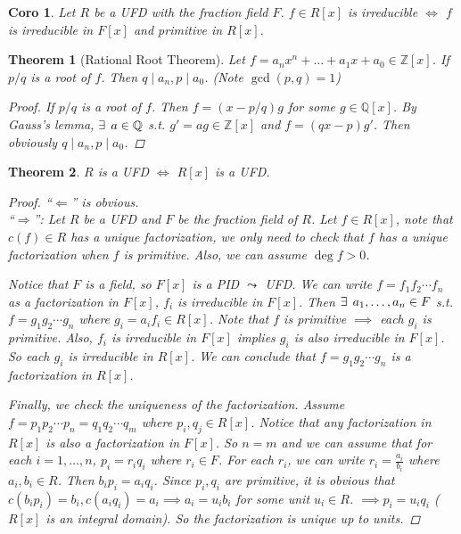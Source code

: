 \documentclass[a4paper]{article}
\let\existstemp\exists
\renewcommand*{\exists}{\existstemp\mkern4mu}
\newcommand{\Zb}{\mathbb{Z}}
\newcommand{\Qb}{\mathbb{Q}}
\theoremstyle{mystyle}
\newtheorem{theorem}{Theorem}
\newtheorem{coro}{Coro}
\begin{document}
\begin{coro}
  Let $R$ be a UFD with the fraction field $F$. $f \in R[x]$
  is irreducible $\iff$ $f$ is irreducible in $F[x]$ and primitive in $R[x]$.
\end{coro}

\begin{theorem}[Rational Root Theorem]
  Let $f = a_n x^n + \dots + a_1 x + a_0 \in \Zb[x]$.
  If $p/q$ is a root of $f$. Then $q \mid a_n, p \mid a_0$.
  (Note $\gcd(p, q) = 1$)
  \begin{proof}
    If $p/q$ is a root of $f$. Then $f = (x - p/q)g$ for some $g \in \Qb[x]$.
    By Gauss's lemma, $\exists a \in \Qb$ s.t. $g' = ag \in \Zb[x]$ and
    $f = (qx - p)g'$. Then obviously $q \mid a_n, p \mid a_0$.
  \end{proof}
\end{theorem}

\begin{theorem}
  $R$ is a UFD $\iff$ $R[x]$ is a UFD.
  \begin{proof}
    ``$\Leftarrow$'' is obvious. \\
    ``$\Rightarrow$'': Let $R$ be a UFD and $F$ be the fraction field of $R$.
    Let $f \in R[x]$, note that $c(f) \in R$ has a unique factorization,
    we only need to check that $f$ has a unique factorization when $f$ is primitive.
    Also, we can assume $\deg f > 0$.

    Notice that $F$ is a field, so $F[x]$ is a PID $\leadsto$ UFD.
    We can write $f = f_1f_2\dotsm f_n$ as a factorization in $F[x]$,
    $f_i$ is irreducible in $F[x]$.
    Then $\exists a_1, \dots, a_n \in F$ s.t.
    $f = g_1 g_2 \dotsm g_n$ where $g_i = a_if_i \in R[x]$.
    Note that $f$ is primitive $\implies$ each $g_i$ is primitive.
    Also, $f_i$ is irreducible in $F[x]$ implies $g_i$ is also irreducible in $F[x]$.
    So each $g_i$ is irreducible in $R[x]$.  We can conclude that 
    $f = g_1 g_2 \dotsm g_n$ is a factorization in $R[x]$.

    Finally, we check the uniqueness of the factorization. Assume
    $f = p_1p_2 \dotsm p_n = q_1q_2 \dotsm q_m$ where $p_i, q_j \in R[x]$.
    Notice that any factorization in $R[x]$ is also a factorization in $F[x]$.
    So $n = m$ and we can assume that for each $i = 1,\dots, n$,
    $p_i = r_i q_i$ where $r_i \in F$. For each $r_i$, we can write
    $r_i = \frac{a_i}{b_i}$ where $a_i, b_i \in R$. Then $b_i p_i = a_i q_i$.
    Since $p_i, q_i$ are primitive, it is obvious that
    $c(b_i p_i) = b_i, c(a_i q_i) = a_i \implies a_i = u_ib_i$ for some unit
    $u_i \in R$.  $\implies p_i = u_i q_i$ ($R[x]$ is an integral domain).
    So the factorization is unique up to units.
  \end{proof}
\end{theorem}
\end{document}

